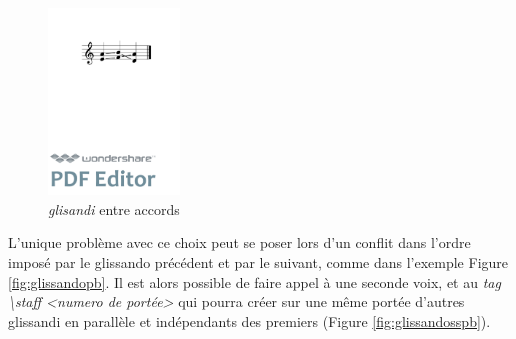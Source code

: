 \documentclass{article}
\newenvironment{gmncode}	{\vspace{-2mm}\small\verbatim}{\endverbatim\vspace{-2mm}}
\begin{document}
\begin{figure}[h]
\begin{center}
\begin{gmncode}
[\glissando({e,a} {f,b} {a,d})]
\end{gmncode}
\bigskip

\includegraphics[width=35mm]{img/glissandosimple.pdf}
\caption{\emph{glisandi} entre accords}
\label{fig:glissandosimple}
\end{center}
\end{figure}

L'unique problème avec ce choix peut se poser lors d'un conflit dans l'ordre imposé par le glissando précédent et par le suivant, comme dans l'exemple Figure \ref{fig:glissandopb}. Il est alors possible de faire appel à une seconde voix, et au \emph{tag \textbackslash{}staff \textless{}numero de portée\textgreater{}} qui pourra créer sur une même portée d'autres glissandi en parallèle et indépendants des premiers (Figure \ref{fig:glissandosspb}).
\end{document}
